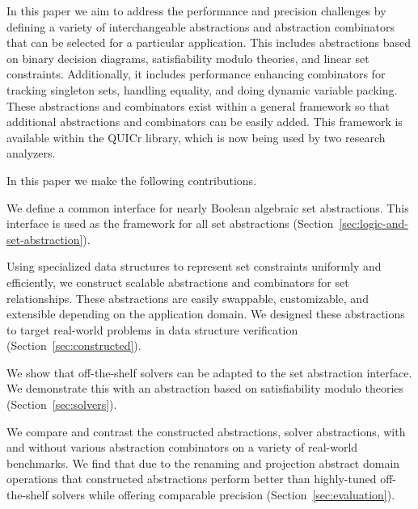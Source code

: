 In this paper we aim to address the performance and precision challenges
by defining a variety of interchangeable abstractions and abstraction
combinators that can be selected for a particular application.
This includes abstractions based on binary decision diagrams,
satisfiability modulo theories, and linear set constraints.
Additionally, it includes performance enhancing combinators for tracking
singleton sets, handling equality, and doing dynamic variable packing.
These abstractions and combinators exist within a general framework so
that additional abstractions and combinators can be easily added.
This framework is available within the QUICr library, which is now being
used by two research analyzers.

In this paper we make the following contributions.
\begin{compactitem}
\item We define a common interface for nearly Boolean algebraic set abstractions.
  This interface is used as the framework for all set
  abstractions (Section~\ref{sec:logic-and-set-abstraction}).
\item Using specialized data structures to represent set constraints uniformly and efficiently, we construct scalable abstractions and combinators for set relationships.  These abstractions are easily swappable, customizable, and extensible depending on the application domain.  We designed these abstractions to target real-world problems in data structure verification (Section~\ref{sec:constructed}).
\item We show that off-the-shelf solvers can be adapted to the set abstraction interface.  We demonstrate this with an abstraction based on satisfiability modulo theories (Section~\ref{sec:solvers}).
\item We compare and contrast the constructed abstractions, solver
  abstractions, with and without various abstraction combinators on a
  variety of real-world benchmarks.  We find that due to the renaming and projection abstract domain operations that constructed abstractions perform better than highly-tuned off-the-shelf solvers while offering comparable precision (Section~\ref{sec:evaluation}).
\end{compactitem}